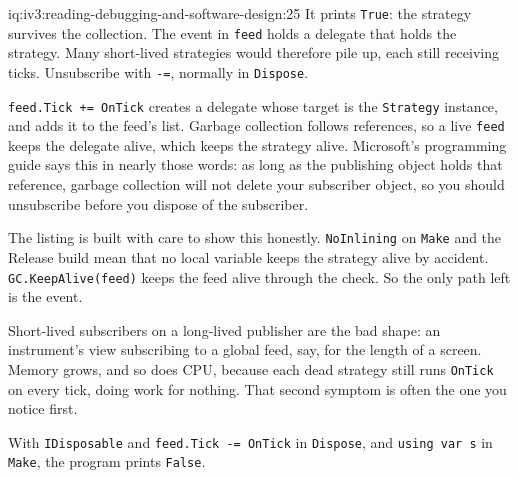 \begin{solution}{iq:iv3:reading-debugging-and-software-design:25}
It prints \texttt{True}: the strategy survives the collection. The event in \texttt{feed} holds a delegate that holds the strategy. Many short-lived strategies would therefore pile up, each still receiving ticks. Unsubscribe with \texttt{-=}, normally in \texttt{Dispose}.

\texttt{feed.Tick += OnTick} creates a delegate whose target is the \texttt{Strategy} instance, and adds it to the feed's list. Garbage collection follows references, so a live \texttt{feed} keeps the delegate alive, which keeps the strategy alive. Microsoft's programming guide says this in nearly those words: as long as the publishing object holds that reference, garbage collection will not delete your subscriber object, so you should unsubscribe before you dispose of the subscriber.

The listing is built with care to show this honestly. \texttt{NoInlining} on \texttt{Make} and the Release build mean that no local variable keeps the strategy alive by accident. \texttt{GC.KeepAlive(feed)} keeps the feed alive through the check. So the only path left is the event.

Short-lived subscribers on a long-lived publisher are the bad shape: an instrument's view subscribing to a global feed, say, for the length of a screen. Memory grows, and so does CPU, because each dead strategy still runs \texttt{OnTick} on every tick, doing work for nothing. That second symptom is often the one you notice first.

With \texttt{IDisposable} and \texttt{feed.Tick -= OnTick} in \texttt{Dispose}, and \texttt{using var s} in \texttt{Make}, the program prints \texttt{False}.



\end{solution}

